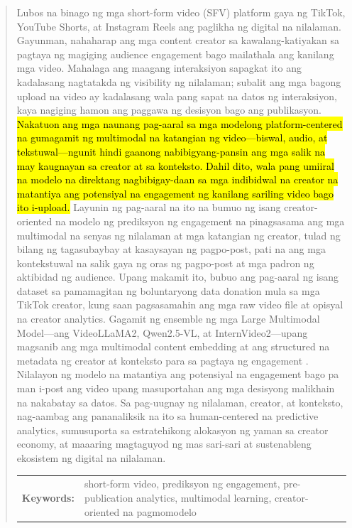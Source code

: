 \begin{abstract}
Lubos na binago ng mga short-form video (SFV) platform gaya ng TikTok, YouTube Shorts, at Instagram Reels ang paglikha ng digital na nilalaman. Gayunman, nahaharap ang mga content creator sa kawalang-katiyakan sa pagtaya ng magiging audience engagement bago mailathala ang kanilang mga video. Mahalaga ang maagang interaksiyon sapagkat ito ang kadalasang nagtatakda ng visibility ng nilalaman; subalit ang mga bagong upload na video ay kadalasang wala pang sapat na datos ng interaksiyon, kaya nagiging hamon ang paggawa ng desisyon bago ang publikasyon. \hl{Nakatuon ang mga naunang pag-aaral sa mga modelong platform-centered na gumagamit ng multimodal na katangian ng video—biswal, audio, at tekstuwal—ngunit hindi gaanong nabibigyang-pansin ang mga salik na may kaugnayan sa creator at sa konteksto. Dahil dito, wala pang umiiral na modelo na direktang nagbibigay-daan sa mga indibidwal na creator na matantiya ang potensiyal na engagement ng kanilang sariling video bago ito i-upload.} Layunin ng pag-aaral na ito na bumuo ng isang creator-oriented na modelo ng prediksyon ng engagement na pinagsasama ang mga multimodal na senyas ng nilalaman at mga katangian ng creator, tulad ng bilang ng tagasubaybay at kasaysayan ng pagpo-post, pati na ang mga kontekstuwal na salik gaya ng oras ng pagpo-post at mga padron ng aktibidad ng audience. Upang makamit ito, bubuo ang pag-aaral ng isang dataset sa pamamagitan ng boluntaryong data donation mula sa mga TikTok creator, kung saan pagsasamahin ang mga raw video file at opisyal na creator analytics. Gagamit ng ensemble ng mga Large Multimodal Model—ang VideoLLaMA2, Qwen2.5-VL, at InternVideo2—upang magsanib ang mga multimodal content embedding at ang structured na metadata ng creator at konteksto para sa pagtaya ng engagement . Nilalayon ng modelo na matantiya ang potensiyal na engagement bago pa man i-post ang video upang masuportahan ang mga desisyong malikhain na nakabatay sa datos. Sa pag-uugnay ng nilalaman, creator, at konteksto, nag-aambag ang pananaliksik na ito sa human-centered na predictive analytics, sumusuporta sa estratehikong alokasyon ng yaman sa creator economy, at maaaring magtaguyod ng mas sari-sari at sustenableng ekosistem ng digital na nilalaman.

\begin{flushleft}
\begin{tabular}{lp{4.25in}}
\hspace{-0.5em}\textbf{Keywords:}\hspace{0.25em} & short-form video, prediksyon ng engagement, pre-publication analytics, multimodal learning, creator-oriented na pagmomodelo
\end{tabular}
\end{flushleft}
\end{abstract}
